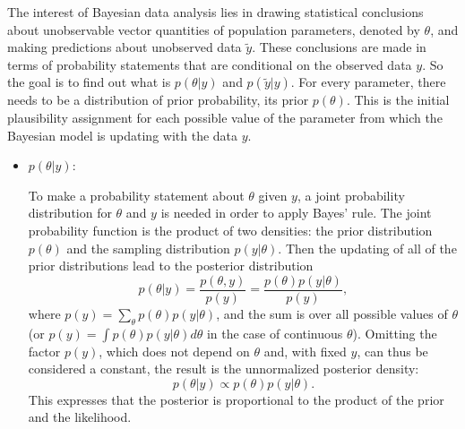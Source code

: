 \documentclass[a4, 12pt]{article}
\begin{document}
The interest of Bayesian data analysis lies in drawing statistical conclusions about unobservable vector quantities of population parameters, denoted by \(\theta\), and making predictions about unobserved data \(\tilde{y}\). These conclusions are made in terms of probability statements that are conditional on the observed data \(y\). So the goal is to find out what is \(p(\theta|y)\) and \(p(\tilde y|y)\). For every parameter, there needs to be a distribution of prior probability, its prior \(p(\theta)\). This is the initial plausibility assignment for each possible value of the parameter from which the Bayesian model is updating with the data \(y\).

\begin{itemize}
\item $p(\theta|y)$:

To make a probability statement about $\theta$ given $y$, a joint probability distribution for $\theta$ and $y$ is needed in order to apply Bayes' rule. The joint probability function is  the product of two densities: the prior distribution $p(\theta)$ and the sampling distribution $p(y|\theta)$.
Then the updating of all of the prior distributions lead to the posterior distribution $$p(\theta|y)=\frac{p(\theta,y)}{p(y)}=\frac{p(\theta)p(y|\theta)}{p(y)},$$ where $p(y)=\sum_\theta{p(\theta)p(y|\theta)}$, and the sum is over all possible values of $\theta$ (or $p(y)=\int p(\theta)p(y|\theta)d\theta$ in the case of continuous $\theta$). Omitting the factor $p(y)$, which does not depend on $\theta$ and, with fixed $y$, can thus be considered a constant, the result is the unnormalized posterior density:
$$p(\theta|y) \propto p(\theta)p(y|\theta).$$ This expresses that the posterior is proportional to the product of the prior and the likelihood.


\end{itemize}
\end{document}
